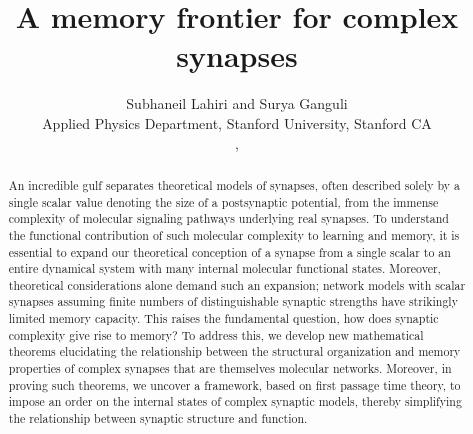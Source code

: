 \documentclass{article} %
\title{A memory frontier for complex synapses}
\author{Subhaneil Lahiri and Surya Ganguli\\
Applied Physics Department, Stanford University, Stanford CA\\
\emaillink{sulahiri@stanford.edu}, \emaillink{sganguli@stanford.edu}
%
}
\begin{document}
\maketitle




\begin{abstract}
  An incredible gulf separates theoretical models of synapses, often described solely by a single scalar value denoting the size of a postsynaptic potential, from the immense complexity of molecular signaling pathways underlying real synapses.
  To understand the functional contribution of such molecular complexity to learning and memory, it is essential to expand our theoretical conception of a synapse from a single scalar to an entire dynamical system with many internal molecular functional states.
  Moreover, theoretical considerations alone demand such an expansion; network models with scalar synapses assuming finite numbers of distinguishable synaptic strengths have strikingly limited memory capacity.
  This raises the fundamental question, how does synaptic complexity give rise to memory?
  To address this, we develop new mathematical theorems elucidating the relationship between the structural organization and memory properties of complex synapses that are themselves molecular networks.
  Moreover, in proving such theorems, we uncover a framework, based on first passage time theory, to impose an order on the internal states of complex synaptic models, thereby simplifying the relationship between synaptic structure and function.

\end{abstract}




%
\end{document}
